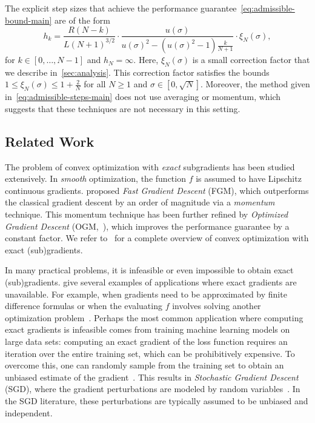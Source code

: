 \documentclass{article}
\begin{document}
The explicit step sizes that achieve the performance guarantee~\eqref{eq:admissible-bound-main} are of the form
\begin{equation}\label{eq:admissible-steps-main}
h_k=\frac{R(N-k)}{L(N+1)^{3/2}}\cdot \frac{u(\sigma)}{u(\sigma)^2-(u(\sigma)^2-1)\frac{k}{N+1}}\cdot \xi_N(\sigma),
\end{equation}
for $k \in [0,\dots,N-1]$ and $h_N=\infty$. Here, $\xi_N(\sigma)$ is a small correction factor that we describe in~\cref{sec:analysis}. This correction factor satisfies the bounds $1\le \xi_N(\sigma)\le1+\frac2N$ for all $N\ge1$ and $\sigma\in[0,\sqrt N]$.
Moreover, the method given in~\eqref{eq:admissible-steps-main} does not use averaging or momentum, which suggests that these techniques are not necessary in this setting.

\subsection{Related Work}
The problem of convex optimization with \emph{exact} subgradients has been studied extensively. In \emph{smooth} optimization, the function $f$ is assumed to have Lipschitz continuous gradients. \citet{nesterov1983method} proposed \emph{Fast Gradient Descent} (FGM), which outperforms the classical gradient descent by an order of magnitude via a \emph{momentum} technique. 
This momentum technique has been further refined by \emph{Optimized Gradient Descent} (OGM,~\citet{kim_optimized_2016}), which improves the performance guarantee by a constant factor.
We refer to~\cite{nesterov_lectures_2018} for a complete overview of convex optimization with exact (sub)gradients. 

In many practical problems, it is infeasible or even impossible to obtain exact (sub)gradients.
\citet{liu2024nonasymptotic} give several examples of applications where exact gradients are unavailable. For example, when gradients need to be approximated by finite difference formulas or when the evaluating $f$ involves solving another optimization problem~\citep{ghadimi2018approximation}.
Perhaps the most common application where computing exact gradients is infeasible comes from training machine learning models on large data sets: computing an exact gradient of the loss function requires an iteration over the entire training set, which can be prohibitively expensive. To overcome this, one can randomly sample from the training set to obtain an unbiased estimate of the gradient~\citep{bottou2010large}.
This results in \emph{Stochastic Gradient Descent} (SGD), where the gradient perturbations are modeled by random variables~\citep{robbins1951stochastic,kiefer1952stochastic}. In the SGD literature, these perturbations are typically assumed to be unbiased and independent.
\end{document}
